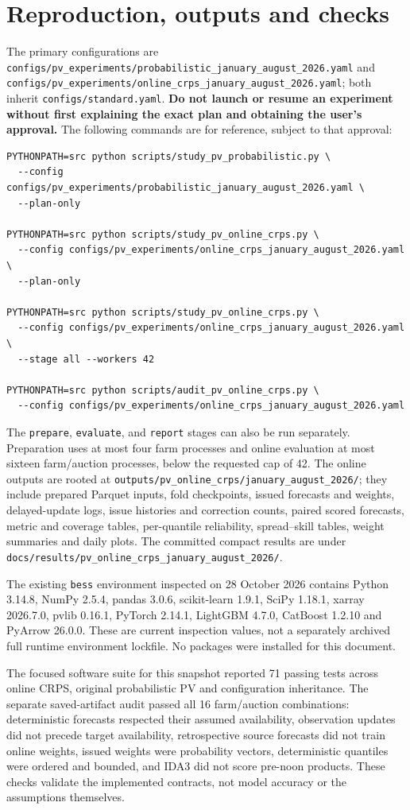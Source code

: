 \documentclass[11pt,a4paper]{article}
\newcommand{\code}[1]{\nolinkurl{#1}}
\begin{document}
\section{Reproduction, outputs and checks}
The primary configurations are \code{configs/pv_experiments/probabilistic_january_august_2026.yaml} and \code{configs/pv_experiments/online_crps_january_august_2026.yaml}; both inherit \code{configs/standard.yaml}. \textbf{Do not launch or resume an experiment without first explaining the exact plan and obtaining the user's approval.} The following commands are for reference, subject to that approval:
\begin{lstlisting}
PYTHONPATH=src python scripts/study_pv_probabilistic.py \
  --config configs/pv_experiments/probabilistic_january_august_2026.yaml \
  --plan-only

PYTHONPATH=src python scripts/study_pv_online_crps.py \
  --config configs/pv_experiments/online_crps_january_august_2026.yaml \
  --plan-only

PYTHONPATH=src python scripts/study_pv_online_crps.py \
  --config configs/pv_experiments/online_crps_january_august_2026.yaml \
  --stage all --workers 42

PYTHONPATH=src python scripts/audit_pv_online_crps.py \
  --config configs/pv_experiments/online_crps_january_august_2026.yaml
\end{lstlisting}
The \code{prepare}, \code{evaluate}, and \code{report} stages can also be run separately. Preparation uses at most four farm processes and online evaluation at most sixteen farm/auction processes, below the requested cap of 42. The online outputs are rooted at \code{outputs/pv_online_crps/january_august_2026/}; they include prepared Parquet inputs, fold checkpoints, issued forecasts and weights, delayed-update logs, issue histories and correction counts, paired scored forecasts, metric and coverage tables, per-quantile reliability, spread--skill tables, weight summaries and daily plots. The committed compact results are under \code{docs/results/pv_online_crps_january_august_2026/}.

The existing \code{bess} environment inspected on 28 October 2026 contains Python 3.14.8, NumPy 2.5.4, pandas 3.0.6, scikit-learn 1.9.1, SciPy 1.18.1, xarray 2026.7.0, pvlib 0.16.1, PyTorch 2.14.1, LightGBM 4.7.0, CatBoost 1.2.10 and PyArrow 26.0.0. These are current inspection values, not a separately archived full runtime environment lockfile. No packages were installed for this document.

The focused software suite for this snapshot reported 71 passing tests across online CRPS, original probabilistic PV and configuration inheritance. The separate saved-artifact audit passed all 16 farm/auction combinations: deterministic forecasts respected their assumed availability, observation updates did not precede target availability, retrospective source forecasts did not train online weights, issued weights were probability vectors, deterministic quantiles were ordered and bounded, and IDA3 did not score pre-noon products. These checks validate the implemented contracts, not model accuracy or the assumptions themselves.
\end{document}
